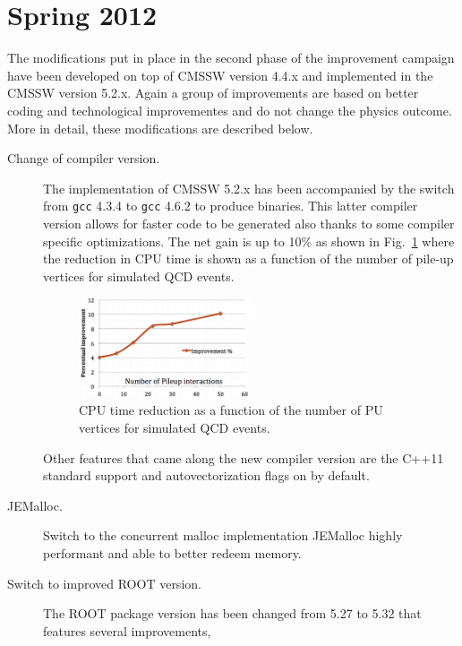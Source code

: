 \section{Spring 2012}
\label{spring12}

The modifications put in place in the second phase of the
improvement campaign have been developed on top of CMSSW version 4.4.x
and implemented in the CMSSW version 5.2.x. Again a group of
improvements are based on better coding and technological
improvementes and do not change the physics outcome. More in detail,
these modifications are described below.

\begin{description}
\item[Change of compiler version.] The implementation of CMSSW
  5.2.x has been accompanied by the switch from \verb-gcc- 4.3.4
  to \verb-gcc- 4.6.2 to produce binaries. This latter compiler
  version allows for faster code to be generated also thanks to some
  compiler specific optimizations. The net gain is up
  to 10\% as shown in Fig.~\ref{fig:gcc} where the reduction in CPU
  time is shown as a function of the number of pile-up vertices for
  simulated QCD events.
\begin{figure}[b]
\begin{center}
\includegraphics*[width=0.5\textwidth]{figs/gcc.png}
\caption{CPU time reduction as a function of the number of PU vertices for
  simulated QCD events.}
\label{fig:gcc}
\end{center}
\end{figure}
  Other features that came along the new compiler version are the
  C++11 standard support and autovectorization flags on by default.
\item[JEMalloc.] Switch to the concurrent malloc implementation
  JEMalloc highly performant and able to better redeem memory.
\item[Switch to improved ROOT version.] The ROOT package version has
  been changed from 5.27 to 5.32 that features several improvements,

\end{description}
